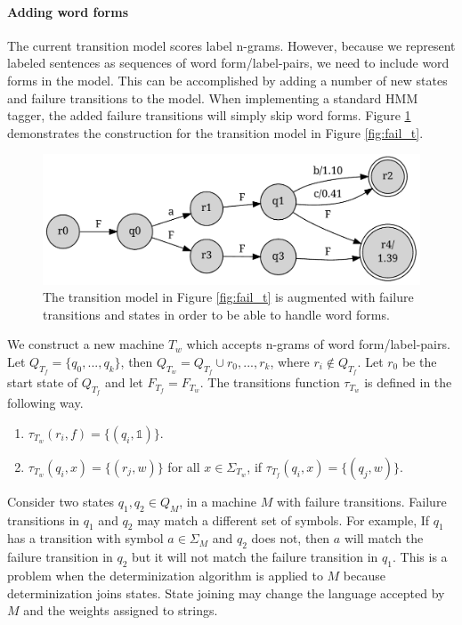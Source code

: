 \paragraph{Adding word forms} The current transition model scores
label n-grams. However, because we represent labeled sentences as
sequences of word form/label-pairs, we need to include word forms in
the model. This can be accomplished by adding a number of new states
and failure transitions to the model. When implementing a standard HMM
tagger, the added failure transitions will simply skip word
forms. Figure \ref{fig:fail_t_wf} demonstrates the construction for
the transition model in Figure \ref{fig:fail_t}.

\begin{figure}[!htb]
\begin{center}
\includegraphics[scale=0.5]{fail_t_wf}
\caption{The transition model in Figure \ref{fig:fail_t} is augmented
  with failure transitions and states in order to be able to handle
  word forms.}\label{fig:fail_t_wf}
\end{center}
\end{figure}

We construct a new machine $T_w$ which accepts n-grams of word
form/label-pairs. Let $Q_{T_f} = \{q_0, ..., q_k\}$, then $Q_{T_w} =
Q_{T_f} \cup {r_0, ..., r_k}$, where $r_i \notin Q_{T_f}$. Let $r_0$
be the start state of $Q_{T_f}$ and let $F_{T_f} = F_{T_w}$. The
transitions function $\tau_{T_w}$ is defined in the following way.

\begin{enumerate}
\item $\tau_{T_w}(r_i,f) = \{(q_i,\mathbb{1})\}$.
\item $\tau_{T_w}(q_i,x) = \{(r_j,w)\}$ for all $x \in \Sigma_{T_w}$, if $\tau_{T_f}(q_i,x) = \{(q_j,w)\}$.
\end{enumerate}

Consider two states $q_1,q_2 \in Q_M$, in a machine $M$ with failure
transitions. Failure transitions in $q_1$ and $q_2$ may match a
different set of symbols. For example, If $q_1$ has a transition with
symbol $a \in \Sigma_M$ and $q_2$ does not, then $a$ will match the
failure transition in $q_2$ but it will not match the failure
transition in $q_1$. This is a problem when the determinization
algorithm is applied to $M$ because determinization joins states.
State joining may change the language accepted by $M$ and the
weights assigned to strings. 

